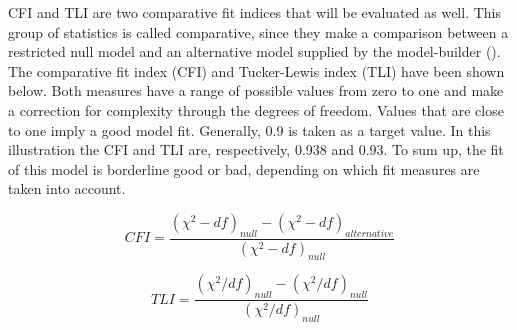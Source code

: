 \documentclass[11pt]{article}
\begin{document}
CFI and TLI are two comparative fit indices that will be evaluated as well.
This group of statistics is called comparative, since they make a comparison
between a restricted null model and an alternative model supplied by
the model-builder (\cite{brown2015}). The comparative fit index (CFI) and
Tucker-Lewis index (TLI) have been shown below. Both measures have a range of
possible values from zero to one and make a correction for complexity through
the degrees of freedom. Values that are close to one imply a good model fit.
Generally, 0.9 is taken as a target value. In this illustration the CFI and
TLI are, respectively, 0.938 and 0.93. To sum up, the fit of this model is
borderline good or bad, depending on which fit measures are taken into account.

\begin{equation}
    CFI = \dfrac{(\chi^2 - df)_{null} - (\chi^2 - df)_{alternative}}{(\chi^2 - df)_{null}}
\end{equation}

\begin{equation}
    TLI = \dfrac{(\chi^2 / df)_{null} - (\chi^2 / df)_{null}}{(\chi^2 / df)_{null}}
\end{equation}

\begin{table}[h!]
\captionsetup{singlelinecheck=off}
\caption{Test statistics}
\end{table}
\end{document}
